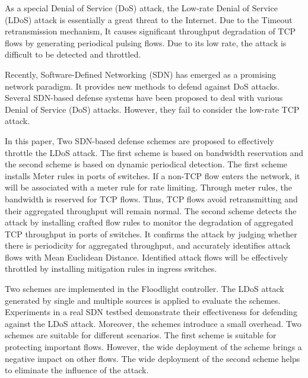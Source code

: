 \begin{eabstract}
  As a special Denial of Service (DoS) attack, the Low-rate Denial of Service (LDoS) attack is essentially a great threat to the Internet. Due to the Timeout retransmission mechanism, It causes significant throughput degradation of TCP flows by generating periodical pulsing flows. Due to its low rate, the attack is difficult to be detected and throttled.

  Recently, Software-Defined Networking (SDN) has emerged as a promising network paradigm. It provides new methods to defend against DoS attacks. Several SDN-based defense systems have been proposed to deal with various Denial of Service (DoS) attacks. However, they fail to consider the low-rate TCP attack.

  In this paper, Two SDN-based defense schemes are proposed to effectively throttle the LDoS attack. The first scheme is based on bandwidth reservation and the second scheme is based on dynamic periodical detection. The first scheme installs Meter rules in ports of switches. If a non-TCP flow enters the network, it will be associated with a meter rule for rate limiting. Through meter rules, the bandwidth is reserved for TCP flows. Thus, TCP flows avoid retransmitting and their aggregated throughput will remain normal. The second scheme detects the attack by installing crafted flow rules to monitor the degradation of aggregated TCP throughput in ports of switches. It confirms the attack by judging whether there is periodicity for aggregated throughput, and accurately identifies attack flows with Mean Euclidean Distance. Identified attack flows will be effectively throttled by installing mitigation rules in ingress switches.

  Two schemes are implemented in the Floodlight controller. The LDoS attack generated by single and multiple sources is applied to evaluate the schemes. Experiments in a real SDN testbed demonstrate their effectiveness for defending against the LDoS attack. Moreover, the schemes introduce a small overhead. Two schemes are suitable for different scenarios. The first scheme is suitable for protecting important flows. However, the wide deployment of the scheme brings a negative impact on other flows. The wide deployment of the second scheme helps to eliminate the influence of the attack.

\end{eabstract}

